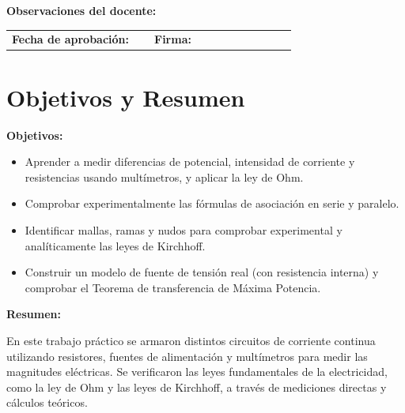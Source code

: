 \documentclass[11pt]{article}
\begin{document}
\begin{titlepage}
    \begin{flushleft}
    {\large\textbf{Observaciones del docente:}}\par
    \vspace{0.2cm}
    \framebox[\linewidth]{\rule{0pt}{3cm}}

    \vspace{0.8cm}

    \begin{tabular}{@{}p{0.45\linewidth} p{0.45\linewidth}@{}}
        \textbf{Fecha de aprobación:} \hrulefill & \textbf{Firma:} \hrulefill \\
    \end{tabular}
    \end{flushleft}

    \vspace{0.5cm}
\end{titlepage}

\newpage
\tableofcontents
\newpage

\section{Objetivos y Resumen}
\textbf{Objetivos:}
\begin{itemize}
    \item Aprender a medir diferencias de potencial, intensidad de corriente y resistencias usando multímetros, y aplicar la ley de Ohm.
    \item Comprobar experimentalmente las fórmulas de asociación en serie y paralelo.
    \item Identificar mallas, ramas y nudos para comprobar experimental y analíticamente las leyes de Kirchhoff.
    \item Construir un modelo de fuente de tensión real (con resistencia interna) y comprobar el Teorema de transferencia de Máxima Potencia.
\end{itemize}

\textbf{Resumen:}

En este trabajo práctico se armaron distintos circuitos de corriente continua utilizando resistores, fuentes de alimentación y multímetros para medir las magnitudes eléctricas. Se verificaron las leyes fundamentales de la electricidad, como la ley de Ohm y las leyes de Kirchhoff, a través de mediciones directas y cálculos teóricos.
\end{document}
